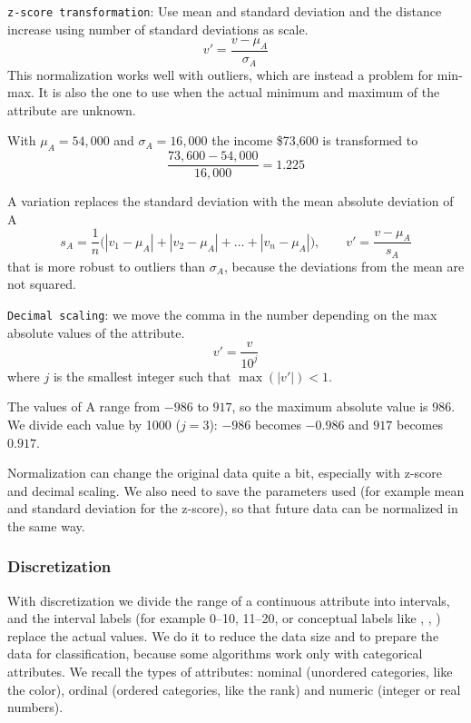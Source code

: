 \texttt{z-score transformation}: Use mean and standard deviation and the distance increase using number of standard deviations as scale. 
\[
    v' = \frac{v - \mu_A}{\sigma_A}
\]
This normalization works well with outliers, which are instead a problem for min-max.
It is also the one to use when the actual minimum and maximum of the attribute are unknown.

\begin{example}
With $\mu_A = 54{,}000$ and $\sigma_A = 16{,}000$ the income \$73,600 is transformed to
\[
    \frac{73{,}600-54{,}000}{16{,}000} = 1.225
\]
\end{example}

A variation replaces the standard deviation with the mean absolute deviation of A
\[
    s_A = \frac{1}{n}\big(|v_1-\mu_A|+|v_2-\mu_A|+\dots+|v_n-\mu_A|\big), \qquad v' = \frac{v-\mu_A}{s_A}
\]
that is more robust to outliers than $\sigma_A$, because the deviations from the mean are not squared.

\texttt{Decimal scaling}: we move the comma in the number depending on the max absolute values of the attribute.
\[
    v' = \frac{v}{10^{j}}
\]
where $j$ is the smallest integer such that $\max(|v'|)<1$.

\begin{example}
The values of A range from $-986$ to $917$, so the maximum absolute value is 986. We divide each value by 1000 ($j=3$): $-986$ becomes $-0.986$ and $917$ becomes $0.917$.
\end{example}

\begin{remark}
Normalization can change the original data quite a bit, especially with z-score and decimal scaling. We also need to save the parameters used (for example mean and standard deviation for the z-score), so that future data can be normalized in the same way.
\end{remark}

\subsubsection{Discretization}
With discretization we divide the range of a continuous attribute into intervals, and the interval labels (for example 0--10, 11--20, or conceptual labels like , , ) replace the actual values. We do it to reduce the data size and to prepare the data for classification, because some algorithms work only with categorical attributes. We recall the types of attributes: nominal (unordered categories, like the color), ordinal (ordered categories, like the rank) and numeric (integer or real numbers).

